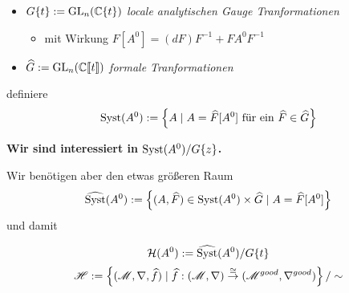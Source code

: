 \begin{itemize}
  \item $G\{t\}:=\operatorname{GL}_n(\mathbb{C}\{t\})$ \emph{locale analytischen Gauge
    Tranformationen}
    \begin{itemize}
      \item mit Wirkung $F[A^0]=(dF)F^{-1}+FA^0F^{-1}$
    \end{itemize}
  \item $\widehat G:=\operatorname{GL}_n(\mathbb{C}\llbracket t\rrbracket)$ \emph{formale
    Tranformationen}
\end{itemize}
definiere
\[
  \operatorname{Syst}(A^0)
  :=\left\{A \mid A=\widehat F[A^0]\text{ für ein }\widehat F\in\widehat G\right\}
\]
\begin{center}
  \textbf{Wir sind interessiert in $\operatorname{Syst}(A^0)/G\{z\}$.}
\end{center}
Wir benötigen aber den etwas größeren Raum
\[
  \widehat{\operatorname{Syst}}(A^0):=
    \left\{(A,\widehat F)\in\operatorname{Syst}(A^0)\times\widehat G\mid A=\widehat F[A^0]\right\}
\]
und damit
\begin{paracol}{5}
  \[
    \mathcal{H}(A^0):=\widehat{\operatorname{Syst}}(A^0)/G\{t\}
  \]
\switchcolumn
\switchcolumn
  \[
    \mathscr{H}:=\left\{(\mathscr{M},\nabla,\widehat f)
      \mid \widehat f:(\mathscr{M},\nabla)\overset{\cong}\to(\mathscr{M}^{good},\nabla^{good})
    \right\}/\sim
  \]
\end{paracol}
